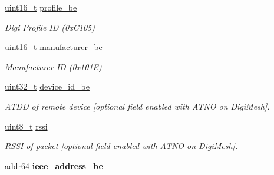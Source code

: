 \begin{DoxyCompactItemize}
\mbox{\label{group__xbee__discovery_ga4de8649ccb3a83bd14fc5702328bb667}} 
\hyperlink{group__hal__dos_ga5a8b2dc9e45a9ee81a94ef304fb62505}{uint16\+\_\+t} \hyperlink{group__xbee__discovery_ga4de8649ccb3a83bd14fc5702328bb667}{profile\+\_\+be}
\begin{DoxyCompactList}\small\item\em Digi Profile ID (0x\+C105) \end{DoxyCompactList}\item 
\mbox{\label{group__xbee__discovery_ga35abb56c1328cf62dfa8e54bc700ed19}} 
\hyperlink{group__hal__dos_ga5a8b2dc9e45a9ee81a94ef304fb62505}{uint16\+\_\+t} \hyperlink{group__xbee__discovery_ga35abb56c1328cf62dfa8e54bc700ed19}{manufacturer\+\_\+be}
\begin{DoxyCompactList}\small\item\em Manufacturer ID (0x101E) \end{DoxyCompactList}\item 
\mbox{\label{group__xbee__discovery_ga7c278740875f8ad1696c446db22e3407}} 
\hyperlink{group__hal__dos_ga09a1e304d66d35dd47daffee9731edaa}{uint32\+\_\+t} \hyperlink{group__xbee__discovery_ga7c278740875f8ad1696c446db22e3407}{device\+\_\+id\+\_\+be}
\begin{DoxyCompactList}\small\item\em A\+T\+DD of remote device \mbox{[}optional field enabled with A\+T\+NO on Digi\+Mesh\mbox{]}. \end{DoxyCompactList}\item 
\mbox{\label{group__xbee__discovery_gafb67d818cd76cce8057affabcb1979a6}} 
\hyperlink{group__hal__dos_gae1affc9ca37cfb624959c866a73f83c2}{uint8\+\_\+t} \hyperlink{group__xbee__discovery_gafb67d818cd76cce8057affabcb1979a6}{rssi}
\begin{DoxyCompactList}\small\item\em R\+S\+SI of packet \mbox{[}optional field enabled with A\+T\+NO on Digi\+Mesh\mbox{]}. \end{DoxyCompactList}\item 
\mbox{\label{group__xbee__discovery_ga231e348f98931de7fde1d09f64264afc}} 
\hyperlink{unionaddr64}{addr64} {\bfseries ieee\+\_\+address\+\_\+be}
\item 

\end{DoxyCompactItemize}
